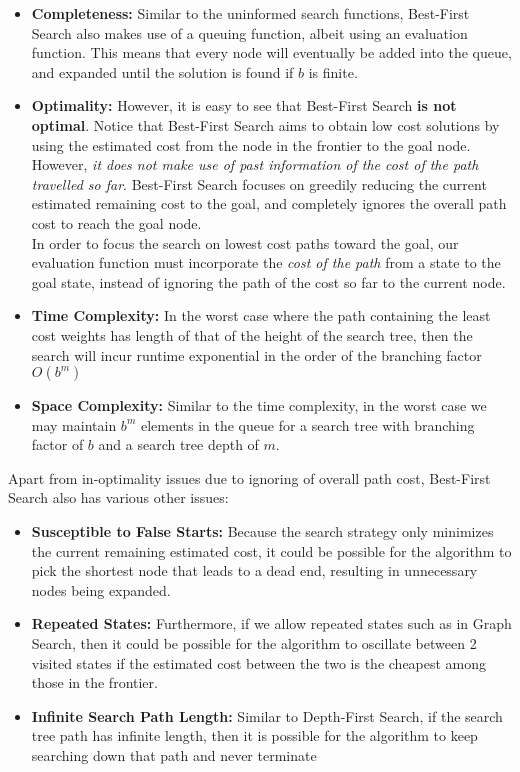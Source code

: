 \documentclass[12pt]{article}
\begin{document}
\begin{itemize}
\item \textbf{Completeness:} Similar to the uninformed search functions, Best-First Search also makes use of a queuing function, albeit using an evaluation function. This means that every node will eventually be added into the queue, and expanded until the solution is found if $b$ is finite. 

\item \textbf{Optimality:} However, it is easy to see that Best-First Search \textbf{is not optimal}. Notice that Best-First Search aims to obtain low cost solutions by using the estimated cost from the node in the frontier to the goal node. However, \textit{it does not make use of past information of the cost of the path travelled so far}. Best-First Search focuses on greedily reducing the current estimated remaining cost to the goal, and completely ignores the overall path cost to reach the goal node.\\

In order to focus the search on lowest cost paths toward the goal, our evaluation function must incorporate the \textit{cost of the path} from a state to the goal state, instead of ignoring the path of the cost so far to the current node.

\item \textbf{Time Complexity:} In the worst case where the path containing the least cost weights has length of that of the height of the search tree, then the search will incur runtime exponential in the order of the branching factor $O(b^m)$

\item \textbf{Space Complexity:} Similar to the time complexity, in the worst case we may maintain $b^m$ elements in the queue for a search tree with branching factor of $b$ and a search tree depth of $m$.
\end{itemize}

Apart from in-optimality issues due to ignoring of overall path cost, Best-First Search also has various other issues:

\begin{itemize}
\item \textbf{Susceptible to False Starts:} Because the search strategy only minimizes the current remaining estimated cost, it could be possible for the algorithm to pick the shortest node that leads to a dead end, resulting in unnecessary nodes being expanded.
\item \textbf{Repeated States:} Furthermore, if we allow repeated states such as in Graph Search, then it could be possible for the algorithm to oscillate between 2 visited states if the estimated cost between the two is the cheapest among those in the frontier.
\item \textbf{Infinite Search Path Length:} Similar to Depth-First Search, if the search tree path has infinite length, then it is possible for the algorithm to keep searching down that path and never terminate
\end{itemize}
\end{document}

